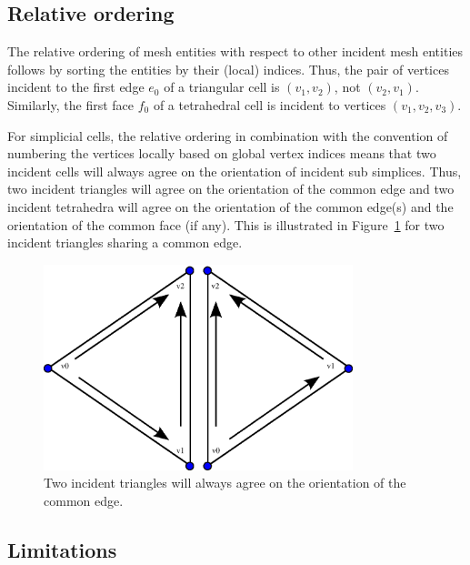 \subsection{Relative ordering}

The relative ordering of mesh entities with respect to other incident
mesh entities follows by sorting the entities by their (local)
indices. Thus, the pair of vertices incident to the first edge $e_0$
of a triangular cell is $(v_1, v_2)$, not $(v_2, v_1)$. Similarly, the
first face $f_0$ of a tetrahedral cell is incident to vertices $(v_1,
v_2, v_3)$.

For simplicial cells, the relative ordering in combination with the
convention of numbering the vertices locally based on global vertex
indices means that two incident cells will always agree on the
orientation of incident sub simplices. Thus, two incident triangles
will agree on the orientation of the common edge and two incident
tetrahedra will agree on the orientation of the common edge(s) and the
orientation of the common face (if any). This is illustrated in
Figure~\ref{fig:orientation_example_triangles} for two incident
triangles sharing a common edge.

\begin{figure}[htbp]
  \begin{center}
    \includegraphics[width=9cm]{eps/orientation_example_triangles.eps}
    \caption{Two incident triangles will always agree on the
      orientation of the common edge.}
    \label{fig:orientation_example_triangles}
  \end{center}
\end{figure}

\subsection{Limitations}
 
